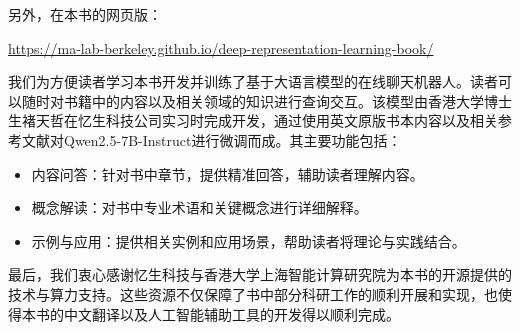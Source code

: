 \documentclass[../../book-main.tex]{subfiles}
\begin{document}
另外，在本书的网页版：
\begin{center}
    \url{https://ma-lab-berkeley.github.io/deep-representation-learning-book/}
\end{center}
我们为方便读者学习本书开发并训练了基于大语言模型的在线聊天机器人。读者可以随时对书籍中的内容以及相关领域的知识进行查询交互。该模型由香港大学博士生褚天哲在忆生科技公司实习时完成开发，通过使用英文原版书本内容以及相关参考文献对Qwen2.5-7B-Instruct进行微调而成。其主要功能包括：
\begin{itemize}
    \item 内容问答：针对书中章节，提供精准回答，辅助读者理解内容。

    \item 概念解读：对书中专业术语和关键概念进行详细解释。

    \item 示例与应用：提供相关实例和应用场景，帮助读者将理论与实践结合。
\end{itemize}

最后，我们衷心感谢忆生科技与香港大学上海智能计算研究院为本书的开源提供的技术与算力支持。这些资源不仅保障了书中部分科研工作的顺利开展和实现，也使得本书的中文翻译以及人工智能辅助工具的开发得以顺利完成。%
\end{document}

